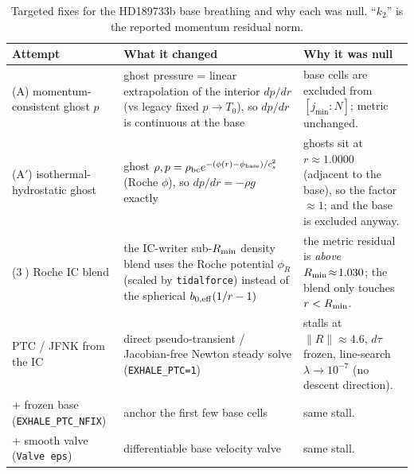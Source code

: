 \documentclass[english,a4paper]{my_memo}
\newcommand{\code}[1]{\texttt{#1}}
\begin{document}
\begin{table}[h]\centering\small
\caption{Targeted fixes for the HD189733b base breathing and why each was
null. ``$k_2$'' is the reported momentum residual norm.}
\label{tab:fix}
\begin{tabular}{@{}l p{5.4cm} p{4.4cm}@{}}
\toprule
Attempt & What it changed & Why it was null \\
\midrule
(A) momentum-consistent ghost $p$ &
  ghost pressure = linear extrapolation of the interior $dp/dr$ (vs legacy
  fixed $p\!\to\!T_0$), so $dp/dr$ is continuous at the base &
  base cells are excluded from $[j_{\min}:N]$; metric unchanged. \\
(A$'$) isothermal-hydrostatic ghost &
  ghost $\rho,p = \rho_{\rm bc}e^{-(\phi(r)-\phi_{\rm base})/c_s^2}$ (Roche
  $\phi$), so $dp/dr=-\rho g$ exactly &
  ghosts sit at $r\approx1.0000$ (adjacent to the base), so the factor
  $\approx1$; and the base is excluded anyway. \\
(\textcircled{3}) Roche IC blend &
  the IC-writer sub-$R_{\rm min}$ density blend uses the Roche potential
  $\phi_R$ (scaled by \code{tidalforce}) instead of the spherical
  $b_{0,\rm eff}(1/r-1)$ &
  the metric residual is \emph{above} $R_{\rm min}\!\approx\!1.030$; the
  blend only touches $r<R_{\rm min}$. \\
\midrule
PTC / JFNK from the IC &
  direct pseudo-transient / Jacobian-free Newton steady solve
  (\code{EXHALE\_PTC=1}) &
  stalls at $\lVert R\rVert\!\approx\!4.6$, $d\tau$ frozen, line-search
  $\lambda\!\to\!10^{-7}$ (no descent direction). \\
\;+ frozen base (\code{EXHALE\_PTC\_NFIX}) & anchor the first few base cells & same stall. \\
\;+ smooth valve (\code{Valve eps}) & differentiable base velocity valve & same stall. \\
\bottomrule
\end{tabular}
\end{table}
\end{document}
